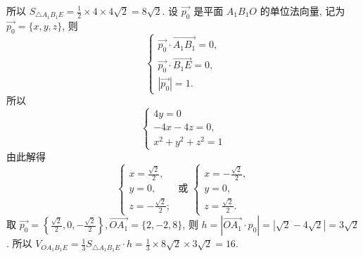 所以 $S_{\triangle A_1 B_1 E}=\frac{1}{2} \times 4 \times 4 \sqrt{2}=8 \sqrt{2}$.
设 $\overrightarrow{p_0}$ 是平面 $A_1 B_1 O$ 的单位法向量, 记为 $\overrightarrow{p_0}=\{x, y, z\}$, 则
$$
\left\{\begin{array}{l}
\overrightarrow{p_0} \cdot \overrightarrow{A_1 B_1}=0, \\
\overrightarrow{p_0} \cdot \overrightarrow{B_1 E}=0, \\
\left|\overrightarrow{p_0}\right|=1 .
\end{array}\right.
$$
所以
$$
\left\{\begin{array}{l}
4 y=0 \\
-4 x-4 z=0, \\
x^2+y^2+z^2=1
\end{array}\right.
$$
由此解得
$$
\left\{\begin{array} { l } 
{ x = \frac { \sqrt { 2 } } { 2 } , } \\
{ y = 0 , } \\
{ z = - \frac { \sqrt { 2 } } { 2 } ; }
\end{array} \text { 或 } \left\{\begin{array}{l}
x=-\frac{\sqrt{2}}{2}, \\
y=0, \\
z=\frac{\sqrt{2}}{2} .
\end{array}\right.\right.
$$
取 $\overrightarrow{p_0}=\left\{\frac{\sqrt{2}}{2}, 0,-\frac{\sqrt{2}}{2}\right\}, \overrightarrow{O A_1}=\{2,-2,8\}$, 则 $h=\left|\overrightarrow{O A_1} \cdot p_0\right|= |\sqrt{2}-4 \sqrt{2}|=3 \sqrt{2}$.
所以 $V_{O A_1 B_1 E}=\frac{1}{3} S_{\triangle A_1 B_1 E} \cdot h=\frac{1}{3} \times 8 \sqrt{2} \times 3 \sqrt{2}=16$.


